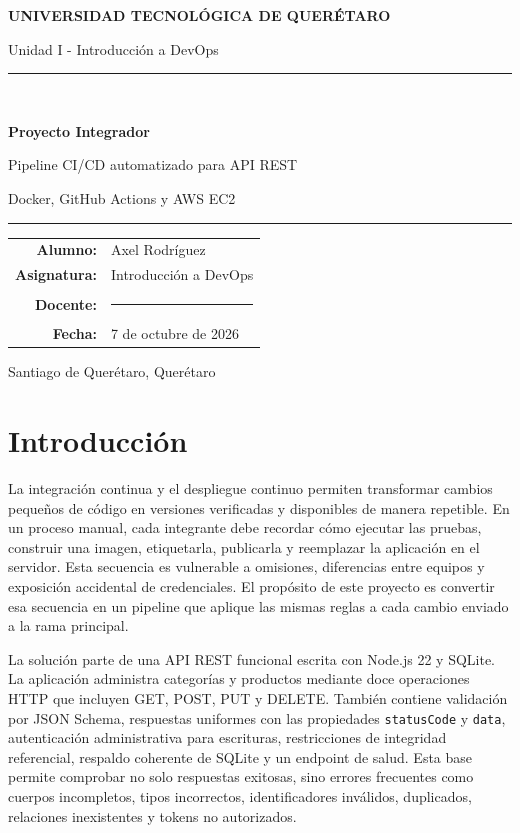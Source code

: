 \documentclass[12pt,letterpaper]{article}
\begin{document}
\begin{titlepage}
\centering
\vspace*{1.2cm}
{\Large\bfseries UNIVERSIDAD TECNOLÓGICA DE QUERÉTARO\par}
\vspace{0.4cm}
{\large Unidad I - Introducción a DevOps\par}
\vfill
{\color{azul}\rule{\textwidth}{2pt}}\\[0.8cm]
{\Huge\bfseries Proyecto Integrador\par}
\vspace{0.35cm}
{\LARGE Pipeline CI/CD automatizado para API REST\par}
\vspace{0.2cm}
{\Large Docker, GitHub Actions y AWS EC2\par}
\vspace{0.8cm}
{\color{azul}\rule{\textwidth}{2pt}}
\vfill
\begin{tabular}{rl}
\textbf{Alumno:} & Axel Rodríguez \\
\textbf{Asignatura:} & Introducción a DevOps \\
\textbf{Docente:} & \rule{7cm}{0.4pt} \\
\textbf{Fecha:} & 7 de octubre de 2026 \\
\end{tabular}
\vfill
{\large Santiago de Querétaro, Querétaro\par}
\end{titlepage}

\tableofcontents
\newpage

\section{Introducción}
\justifying
La integración continua y el despliegue continuo permiten transformar cambios pequeños de código en versiones verificadas y disponibles de manera repetible. En un proceso manual, cada integrante debe recordar cómo ejecutar las pruebas, construir una imagen, etiquetarla, publicarla y reemplazar la aplicación en el servidor. Esta secuencia es vulnerable a omisiones, diferencias entre equipos y exposición accidental de credenciales. El propósito de este proyecto es convertir esa secuencia en un pipeline que aplique las mismas reglas a cada cambio enviado a la rama principal.

La solución parte de una API REST funcional escrita con Node.js 22 y SQLite. La aplicación administra categorías y productos mediante doce operaciones HTTP que incluyen GET, POST, PUT y DELETE. También contiene validación por JSON Schema, respuestas uniformes con las propiedades \texttt{statusCode} y \texttt{data}, autenticación administrativa para escrituras, restricciones de integridad referencial, respaldo coherente de SQLite y un endpoint de salud. Esta base permite comprobar no solo respuestas exitosas, sino errores frecuentes como cuerpos incompletos, tipos incorrectos, identificadores inválidos, duplicados, relaciones inexistentes y tokens no autorizados.
\end{document}
